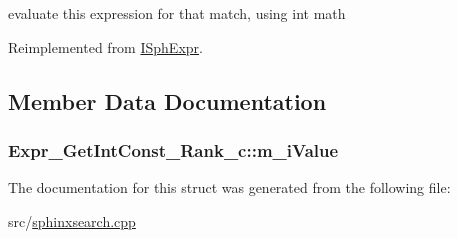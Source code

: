 evaluate this expression for that match, using int math 



Reimplemented from \hyperlink{structISphExpr_a32fb4380bed5d788ce29c0c659b2e917}{I\-Sph\-Expr}.



\subsection{Member Data Documentation}
\hypertarget{structExpr__GetIntConst__Rank__c_a7d4c2e5ba8df8d5093bac3dace545ce7}{
\subsubsection[{m\-\_\-i\-Value}]{ Expr\-\_\-\-Get\-Int\-Const\-\_\-\-Rank\-\_\-c\-::m\-\_\-i\-Value}}\label{structExpr__GetIntConst__Rank__c_a7d4c2e5ba8df8d5093bac3dace545ce7}


The documentation for this struct was generated from the following file\-:\begin{DoxyCompactItemize}
\item 
src/\hyperlink{sphinxsearch_8cpp}{sphinxsearch.\-cpp}\end{DoxyCompactItemize}

